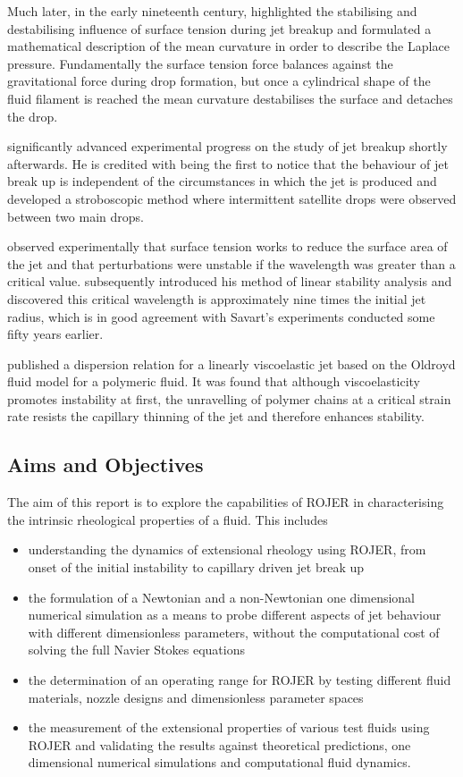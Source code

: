 \documentclass[11pt]{article}
\begin{document}
Much later, in the early nineteenth century, \cite{young1805essay} highlighted the stabilising and destabilising influence of surface tension during jet breakup and \cite{laplace1805traite} formulated a mathematical description of the mean curvature in order to describe the Laplace pressure. Fundamentally the surface tension force balances against the gravitational force during drop formation, but once a cylindrical shape of the fluid filament is reached the mean curvature destabilises the surface and detaches the drop.

\cite{savart1833memoire} significantly advanced experimental progress on the study of jet breakup shortly afterwards. He is credited with being the first to notice that the behaviour of jet break up is independent of the circumstances in which the jet is produced and developed a stroboscopic method where intermittent satellite drops were observed between two main drops. 

\cite{plateau1873statique} observed experimentally that surface tension works to reduce the surface area of the jet and that perturbations were unstable if the wavelength was greater than a critical value. \cite{strutt1878instability} subsequently introduced his method of linear stability analysis and discovered this critical wavelength is approximately nine times the initial jet radius, which is in good agreement with Savart's experiments conducted some fifty years earlier.

\cite{middleman1965stability} published a dispersion relation for a linearly viscoelastic jet based on the Oldroyd fluid model for a polymeric fluid. It was found that although viscoelasticity promotes instability at first, the unravelling of polymer chains at a critical strain rate resists the capillary thinning of the jet and therefore enhances stability.

\subsection{Aims and Objectives}
The aim of this report is to explore the capabilities of ROJER in characterising the intrinsic rheological properties of a fluid. This includes
\begin{itemize}
\item understanding the dynamics of extensional rheology using ROJER, from onset of the initial instability to capillary driven jet break up
\item the formulation of a Newtonian and a non-Newtonian one dimensional numerical simulation as a means to probe different aspects of jet behaviour with different dimensionless parameters, without the computational cost of solving the full Navier Stokes equations
\item the determination of an operating range for ROJER by testing different fluid materials, nozzle designs and dimensionless parameter spaces
\item the measurement of the extensional properties of various test fluids using ROJER and validating the results against theoretical predictions, one dimensional numerical simulations and computational fluid dynamics. 
\end{itemize}
\end{document}
